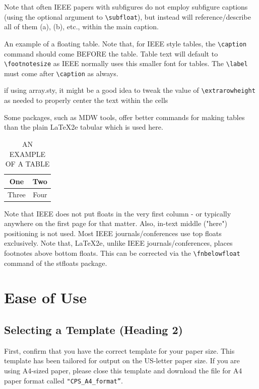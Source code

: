 \documentclass[10pt, conference, a4paper, compsocconf]{IEEEtran}
\begin{document}

Note that often IEEE papers with subfigures do not employ subfigure
captions (using the optional argument to \verb+\subfloat+), but instead will
reference/describe all of them (a), (b), etc., within the main caption.


An example of a floating table. Note that, for IEEE style tables, the
\verb+\caption+ command should come BEFORE the table. Table text will default to
\verb+ \footnotesize+ as IEEE normally uses this smaller font for tables.
 The \verb+\label+ must come after \verb+\caption+ as always.

\begin{table}[!t]
\renewcommand{\arraystretch}{1.3}
 if using array.sty, it might be a good idea to tweak the value of
 \verb+\extrarowheight+ as needed to properly center the text within the cells
\caption{\uppercase{An Example of a Table}}
\label{table_example}
\centering
 Some packages, such as MDW tools, offer better commands for making tables
 than the plain LaTeX2e tabular which is used here.
\begin{tabular}{|c||c|}
\hline
One & Two\\
\hline
Three & Four\\
\hline
\end{tabular}
\end{table}


 Note that IEEE does not put floats in the very first column - or typically
 anywhere on the first page for that matter. Also, in-text middle ("here")
 positioning is not used. Most IEEE journals/conferences use top floats
 exclusively. Note that, LaTeX2e, unlike IEEE journals/conferences, places
 footnotes above bottom floats. This can be corrected via the \verb+\fnbelowfloat+
 command of the stfloats package.

\section{Ease of Use}
\subsection{Selecting a Template (Heading 2)}
First, confirm that you have the correct template for your paper size. This template has been tailored for output on the US-letter paper size. If you are using A4-sized paper, please close this template and download the file for A4 paper format called \verb+"CPS_A4_format”+.
\end{document}
